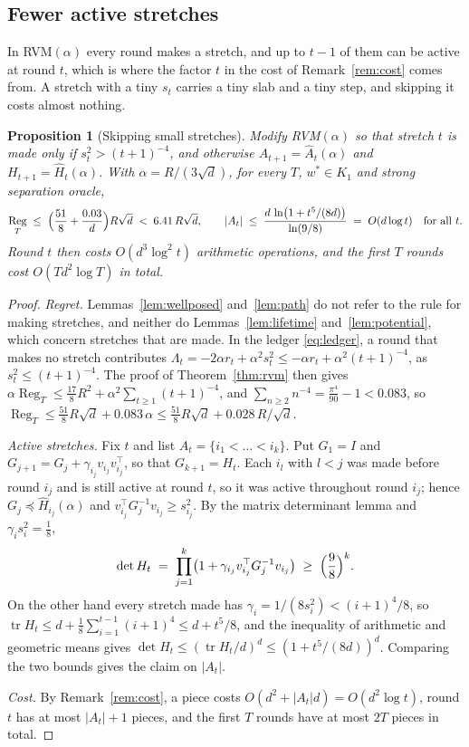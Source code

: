 \documentclass[11pt]{article}
\theoremstyle{plain}
\newtheorem{proposition}[theorem]{Proposition}
\theoremstyle{definition}
\theoremstyle{remark}
\DeclareMathOperator{\tr}{tr}
\DeclareMathOperator{\Reg}{Reg}
\newcommand{\wstar}{w^{\ast}}
\begin{document}
\subsection{Fewer active stretches}\label{sec:small}

In RVM$(\alpha)$ every round makes a stretch, and up to $t-1$ of them can be active at round $t$,
which is where the factor $t$ in the cost of Remark~\ref{rem:cost} comes from. A stretch with a tiny
$s_t$ carries a tiny slab and a tiny step, and skipping it costs almost nothing.

\begin{proposition}[Skipping small stretches]\label{prop:small}
Modify RVM$(\alpha)$ so that stretch $t$ is made only if $s_t^{2}>(t+1)^{-4}$, and otherwise
$A_{t+1}=\hat A_t(\alpha)$ and $H_{t+1}=\hat H_t(\alpha)$. With $\alpha=R/(3\sqrt d)$, for every
$T$, $\wstar\in K_1$ and strong separation oracle,
\[
  \Reg_T\;\le\;\Bigl(\frac{51}{8}+\frac{0.03}{d}\Bigr)R\sqrt d\;<\;6.41\,R\sqrt d ,
  \qquad
  |A_t|\;\le\;\frac{d\,\ln\bigl(1+t^{5}/(8d)\bigr)}{\ln(9/8)}\;=\;O(d\log t)\quad\text{for all }t .
\]
Round $t$ then costs $O(d^{3}\log^{2}t)$ arithmetic operations, and the first $T$ rounds cost
$O(Td^{2}\log T)$ in total.
\end{proposition}

\begin{proof}
\emph{Regret.} Lemmas~\ref{lem:wellposed} and~\ref{lem:path} do not refer to the rule for making
stretches, and neither do Lemmas~\ref{lem:lifetime} and~\ref{lem:potential}, which concern stretches
that are made. In the ledger \eqref{eq:ledger}, a round that makes no stretch contributes
$\Lambda_t=-2\alpha r_t+\alpha^{2}s_t^{2}\le-\alpha r_t+\alpha^{2}(t+1)^{-4}$, as
$s_t^{2}\le(t+1)^{-4}$. The proof of Theorem~\ref{thm:rvm} then gives
$\alpha\Reg_T\le\tfrac{17}{8}R^{2}+\alpha^{2}\sum_{t\ge1}(t+1)^{-4}$, and
$\sum_{n\ge2}n^{-4}=\tfrac{\pi^{4}}{90}-1<0.083$, so
$\Reg_T\le\tfrac{51}{8}R\sqrt d+0.083\,\alpha\le\tfrac{51}{8}R\sqrt d+0.028\,R/\sqrt d$.

\emph{Active stretches.} Fix $t$ and list $A_t=\{i_1<\dots<i_k\}$. Put $G_1=I$ and
$G_{j+1}=G_j+\gamma_{i_j}v_{i_j}v_{i_j}^{\top}$, so that $G_{k+1}=H_t$. Each $i_l$ with $l<j$ was made
before round $i_j$ and is still active at round $t$, so it was active throughout round $i_j$;
hence $G_j\preceq\hat H_{i_j}(\alpha)$ and $v_{i_j}^{\top}G_j^{-1}v_{i_j}\ge s_{i_j}^{2}$. By the matrix
determinant lemma and $\gamma_is_i^{2}=\tfrac18$,
\[
  \det H_t\;=\;\prod_{j=1}^{k}\bigl(1+\gamma_{i_j}v_{i_j}^{\top}G_j^{-1}v_{i_j}\bigr)
  \;\ge\;\Bigl(\frac98\Bigr)^{k} .
\]
On the other hand every stretch made has $\gamma_i=1/(8s_i^{2})<(i+1)^{4}/8$, so
$\tr H_t\le d+\tfrac18\sum_{i=1}^{t-1}(i+1)^{4}\le d+t^{5}/8$, and the inequality of arithmetic and
geometric means gives $\det H_t\le(\tr H_t/d)^{d}\le(1+t^{5}/(8d))^{d}$. Comparing the two bounds
gives the claim on $|A_t|$.

\emph{Cost.} By Remark~\ref{rem:cost}, a piece costs $O(d^{2}+|A_t|d)=O(d^{2}\log t)$, round $t$ has
at most $|A_t|+1$ pieces, and the first $T$ rounds have at most $2T$ pieces in total.
\end{proof}
\end{document}

